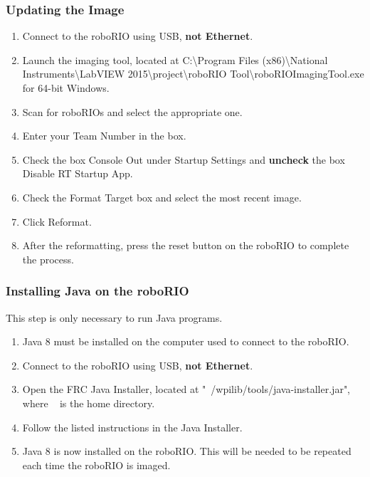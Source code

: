 \documentclass[]{report}
\begin{document}
\subsubsection{Updating the Image}
\begin{enumerate}
\item Connect to the roboRIO using USB, \textbf{not Ethernet}.
\item Launch the imaging tool, located at C:\textbackslash Program Files (x86)\textbackslash National Instruments\textbackslash LabVIEW 2015\textbackslash project\textbackslash roboRIO Tool\textbackslash roboRIO\textunderscore ImagingTool.exe for 64-bit Windows.
\item Scan for roboRIOs and select the appropriate one.
\item Enter your Team Number in the box.
\item Check the box Console Out under Startup Settings and \textbf{uncheck} the box Disable RT Startup App.
\item Check the Format Target box and select the most recent image.
\item Click Reformat.
\item After the reformatting, press the reset button on the roboRIO to complete the process.
\end{enumerate}

\subsubsection{Installing Java on the roboRIO}
This step is only necessary to run Java programs.
\begin{enumerate}
\item Java 8 must be installed on the computer used to connect to the roboRIO.
\item Connect to the roboRIO using USB, \textbf{not Ethernet}.
\item Open the FRC Java Installer, located at "~/wpilib/tools/java-installer.jar", where ~ is the home directory.
\item Follow the listed instructions in the Java Installer.
\item Java 8 is now installed on the roboRIO. This will be needed to be repeated each time the roboRIO is imaged.
\end{enumerate}
\end{document}
